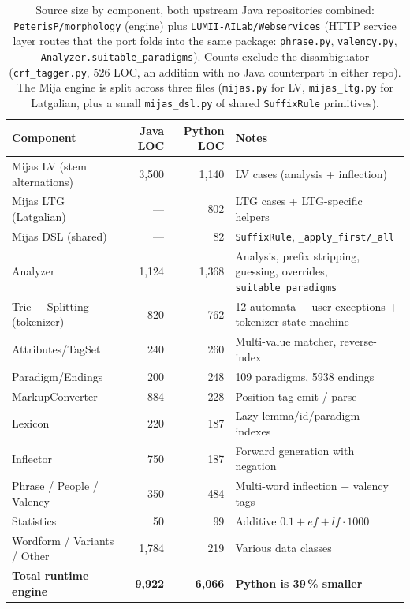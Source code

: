 \documentclass[11pt,a4paper]{article}
\begin{document}
\begin{table}[h]
\centering
\small
\begin{tabular}{lrrp{5cm}}
\toprule
\textbf{Component} & \textbf{Java LOC} & \textbf{Python LOC} & \textbf{Notes} \\
\midrule
Mijas LV (stem alternations) & 3{,}500 & 1{,}140 & LV cases (analysis + inflection) \\
Mijas LTG (Latgalian) & --- & 802 & LTG cases + LTG-specific helpers \\
Mijas DSL (shared) & --- & 82 & \texttt{SuffixRule}, \texttt{\_apply\_first/\_all} \\
Analyzer & 1{,}124 & 1{,}368 & Analysis, prefix stripping, guessing, overrides, \texttt{suitable\_paradigms} \\
Trie + Splitting (tokenizer) & 820 & 762 & 12 automata + user exceptions + tokenizer state machine \\
Attributes/TagSet & 240 & 260 & Multi-value matcher, reverse-index \\
Paradigm/Endings & 200 & 248 & 109 paradigms, 5938 endings \\
MarkupConverter & 884 & 228 & Position-tag emit / parse \\
Lexicon & 220 & 187 & Lazy lemma/id/paradigm indexes \\
Inflector & 750 & 187 & Forward generation with negation \\
Phrase / People / Valency & 350 & 484 & Multi-word inflection + valency tags \\
Statistics & 50 & 99 & Additive $0.1 + ef + lf \cdot 1000$ \\
Wordform / Variants / Other & 1{,}784 & 219 & Various data classes \\
\midrule
\textbf{Total runtime engine} & \textbf{9{,}922} & \textbf{6{,}066} & \textbf{Python is 39\,\% smaller} \\
\bottomrule
\end{tabular}
\caption{Source size by component, both upstream Java repositories
combined: \texttt{PeterisP/morphology} (engine) plus
\texttt{LUMII-AILab/Webservices} (HTTP service layer routes that the port
folds into the same package: \texttt{phrase.py}, \texttt{valency.py},
\texttt{Analyzer.suitable\_paradigms}). Counts exclude the disambiguator
(\texttt{crf\_tagger.py}, 526 LOC, an addition with no Java counterpart in
either repo). The Mija engine is split across three files
(\texttt{mijas.py} for LV, \texttt{mijas\_ltg.py} for Latgalian, plus a
small \texttt{mijas\_dsl.py} of shared \texttt{SuffixRule} primitives).}
\label{tab:loc}
\end{table}
\end{document}
